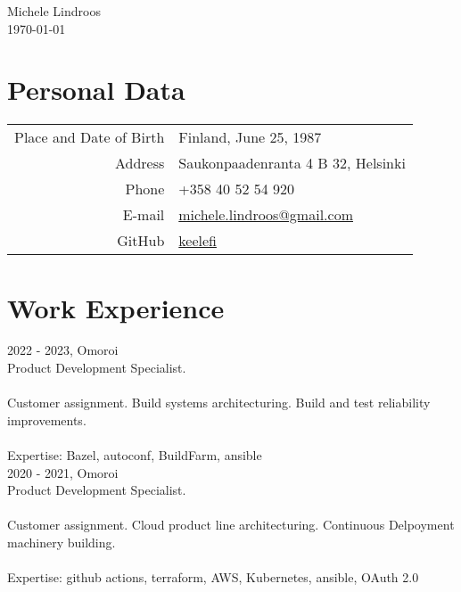 \documentclass[12pt]{article}
\begin{document}

\begin{center}
\Huge{Michele Lindroos} \\
\normalsize{\today}
\end{center}


\section*{Personal Data}
\begin{tabular}{rl}
Place and Date of Birth & Finland, June 25, 1987\\
Address & Saukonpaadenranta 4 B 32, Helsinki\\
Phone & +358 40 52 54 920\\
E-mail & \href{mailto:michele.lindroos@gmail.com}{michele.lindroos@gmail.com}\\
GitHub & \href{https://github.com/keelefi}{keelefi}
\end{tabular}


\section*{Work Experience}

\large{2022 - 2023, Omoroi}\\
\normalsize{Product Development Specialist.}\\
\\
\normalsize{Customer assignment. Build systems architecturing. Build and test reliability improvements.}\\
\\
\normalsize{Expertise: Bazel, autoconf, BuildFarm, ansible}\\

\large{2020 - 2021, Omoroi}\\
\normalsize{Product Development Specialist.}\\
\\
\normalsize{Customer assignment. Cloud product line architecturing. Continuous Delpoyment machinery building.}\\
\\
\normalsize{Expertise: github actions, terraform, AWS, Kubernetes, ansible, OAuth 2.0}\\
\end{document}
